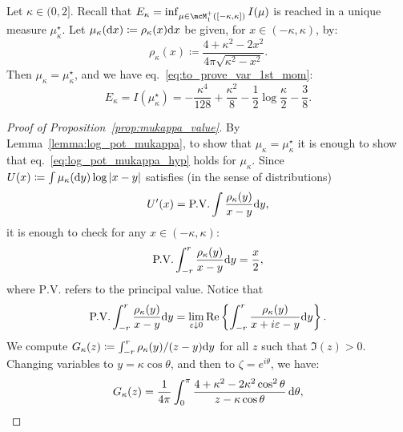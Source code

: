 {\begin{proposition}
    \label{prop:mukappa_value}
    Let $\kappa \in (0,2]$.
    Recall that $E_\kappa = \inf_{\mu \in \mcM_1^+([-\kappa,\kappa])} I(\mu)$ is reached in a unique measure $\mu_\kappa^\star$.
    Let $\mu_\kappa(\mathrm{d} x) \coloneqq \rho_\kappa(x) \mathrm{d} x$ be given, for $x \in (-\kappa,\kappa)$, by:
    \begin{equation}\label{eq:def_rhokappa}
        \rho_\kappa(x) \coloneqq \frac{4+\kappa^2-2x^2}{4 \pi \sqrt{\kappa^2 - x^2}}. 
    \end{equation}
    Then $\mu_\kappa = \mu_\kappa^\star$, and we have eq.~\eqref{eq:to_prove_var_1st_mom}:
    \begin{equation*}
        E_\kappa = I(\mu_\kappa^\star) = - \frac{\kappa^4}{128} + \frac{\kappa^2}{8} - \frac{1}{2} \log \frac{\kappa}{2} - \frac{3}{8}.
    \end{equation*}
\end{proposition}
\noindent
\begin{proof}[Proof of Proposition~\ref{prop:mukappa_value}] 
    By Lemma~\ref{lemma:log_pot_mukappa}, to show that $\mu_\kappa = \mu_\kappa^\star$ it is enough to show that eq.~\eqref{eq:log_pot_mukappa_hyp} 
    holds for $\mu_\kappa$. 
    Since $U(x) \coloneqq \int \mu_\kappa(\mathrm{d} y) \log |x-y|$ satisfies (in the sense of distributions)
    \begin{equation*}
        U'(x) = \textrm{P.V.} \int \frac{\rho_\kappa(y)}{x-y} \mathrm{d} y,
    \end{equation*}
    it is enough to check for any $x \in (-\kappa,\kappa)$:
    \begin{equation}\label{eq:to_show_rhokappa}
        \textrm{P.V.}\int_{-r}^r \frac{\rho_\kappa(y)}{x-y} \mathrm{d} y = \frac{x}{2}, 
    \end{equation}
    where $\textrm{P.V.}$ refers to the principal value. 
    Notice that
    \begin{equation*}
        \textrm{P.V.}\int_{-r}^r \frac{\rho_\kappa(y)}{x-y} \mathrm{d} y = \lim_{\varepsilon \downarrow 0} \mathrm{Re}\left\{\int_{-r}^r \frac{\rho_\kappa(y)}{x+i\varepsilon-y} \mathrm{d} y\right\}.
    \end{equation*}
    We compute $G_\kappa(z) \coloneqq \int_{-r}^r \rho_\kappa(y)/(z-y) \mathrm{d} y$ for all $z$ such that $\Im(z) > 0$.
    Changing variables to $y = \kappa \cos \theta$, and then to $\zeta = e^{i \theta}$, we have:
    \begin{align*}
        G_\kappa(z) &= \frac{1}{4\pi} \int_0^\pi \frac{4+\kappa^2 -2 \kappa^2 \cos^2 \theta}{z - \kappa \cos \theta} \, \rd \theta, \\ 

\end{align*}
\end{proof}}
